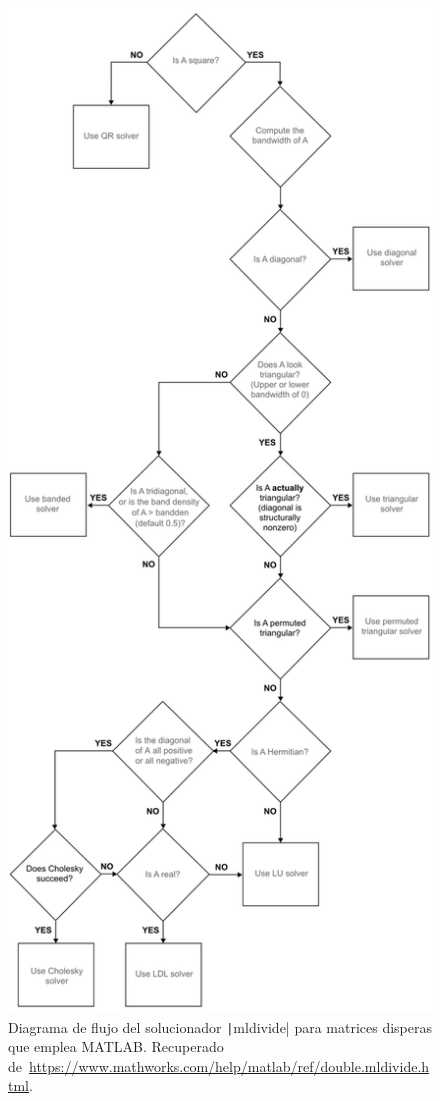 \begin{problem}
\begin{itemize}
            \begin{figure}[ht!]
                  \centering
                  \includegraphics[width=.3\paperwidth]{mldivide_sparse}
                  \caption{Diagrama de flujo del solucionador
                        \texttt|mldivide| para matrices
                        disperas que emplea MATLAB.
                        Recuperado de~\url{https://www.mathworks.com/help/matlab/ref/double.mldivide.html}.}
            \end{figure}
\end{itemize}


\end{problem}
